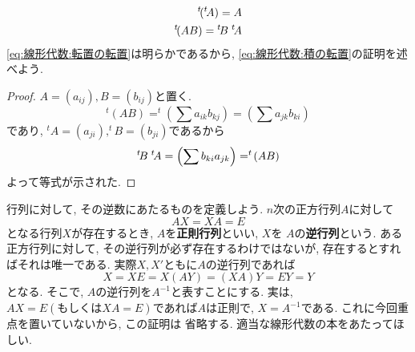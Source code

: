 \documentclass[a4j,dvipdfmx]{jsarticle}
\numberwithin{equation}{section}
\begin{document}
            \begin{align}
                ^t\!(^t\!A)=A \label{eq:線形代数:転置の転置} \\
                ^t\!(AB) = {}^t\!B \hspace{1mm}{}^t\!A \label{eq:線形代数:積の転置}
            \end{align}
            \eqref{eq:線形代数:転置の転置}は明らかであるから, \eqref{eq:線形代数:積の転置}の証明を述べよう.
            \begin{proof}
                $A=(a_{ij}),B=(b_{ij})$と置く.
                \begin{equation*}
                    ^t\!(AB)=^t\!\left(\sum a_{ik}b_{kj}\right)=\left(\sum a_{jk}b_{ki}\right)
                \end{equation*}
                であり, $^t\!A=(a_{ji}),^t\!B=(b_{ji})$であるから
                \begin{equation*}
                    ^t\!B\hspace{1mm} ^t\! A = \left(\sum b_{ki}a_{jk}\right) = ^t\!(AB)
                \end{equation*}
                よって等式が示された.
            \end{proof}
            \clearpage
            行列に対して, その逆数にあたるものを定義しよう. $n$次の正方行列$A$に対して
            \begin{equation}
                AX=XA=E \label{eq:線形代数:逆行列の定義}
            \end{equation}
            となる行列$X$が存在するとき, $A$を\textbf{正則行列}といい, $X$を
            $A$の\textbf{逆行列}という. ある正方行列に対して, その逆行列が必ず存在するわけではないが, 
            存在するとすればそれは唯一である. 実際$X,X'$ともに$A$の逆行列であれば
            \begin{equation*}
                X=XE=X(AY)=(XA)Y=EY=Y
            \end{equation*} 
            となる. そこで, $A$の逆行列を$A^{-1}$と表すことにする. 実は, $AX=E(\text{もしくは}XA=E)$であれば$A$は正則で, $X=A^{-1}$である. これに今回重点を置いていないから, この証明は
            省略する. 適当な線形代数の本をあたってほしい.
\end{document}
